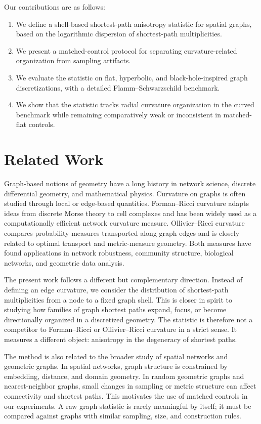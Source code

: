 \documentclass{svproc}
\begin{document}
Our contributions are as follows:
\begin{enumerate}
    \item We define a shell-based shortest-path anisotropy statistic for spatial graphs, based on the logarithmic dispersion of shortest-path multiplicities.
    \item We present a matched-control protocol for separating curvature-related organization from sampling artifacts.
    \item We evaluate the statistic on flat, hyperbolic, and black-hole-inspired graph discretizations, with a detailed Flamm--Schwarzschild benchmark.
    \item We show that the statistic tracks radial curvature organization in the curved benchmark while remaining comparatively weak or inconsistent in matched-flat controls.
\end{enumerate}

\section{Related Work}

Graph-based notions of geometry have a long history in network science, discrete differential geometry, and mathematical physics. Curvature on graphs is often studied through local or edge-based quantities. Forman--Ricci curvature adapts ideas from discrete Morse theory to cell complexes and has been widely used as a computationally efficient network curvature measure. Ollivier--Ricci curvature compares probability measures transported along graph edges and is closely related to optimal transport and metric-measure geometry. Both measures have found applications in network robustness, community structure, biological networks, and geometric data analysis.

The present work follows a different but complementary direction. Instead of defining an edge curvature, we consider the distribution of shortest-path multiplicities from a node to a fixed graph shell. This is closer in spirit to studying how families of graph shortest paths expand, focus, or become directionally organized in a discretized geometry. The statistic is therefore not a competitor to Forman--Ricci or Ollivier--Ricci curvature in a strict sense. It measures a different object: anisotropy in the degeneracy of shortest paths.

The method is also related to the broader study of spatial networks and geometric graphs. In spatial networks, graph structure is constrained by embedding, distance, and domain geometry. In random geometric graphs and nearest-neighbor graphs, small changes in sampling or metric structure can affect connectivity and shortest paths. This motivates the use of matched controls in our experiments. A raw graph statistic is rarely meaningful by itself; it must be compared against graphs with similar sampling, size, and construction rules.
\end{document}
